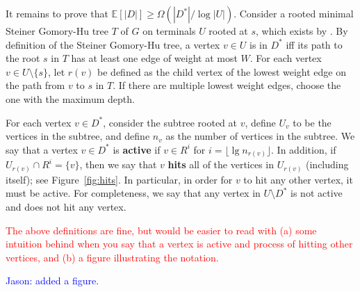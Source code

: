 \documentclass{article}
\newcommand{\sm}{\setminus}
\newcommand{\Om}{\Omega}
\newcommand{\lf}{\lfloor}
\newcommand{\rf}{\rfloor}
\newcommand{\E}{\mathbb E}
\newcommand{\1}{\mathbbm 1}
\newcommand{\alert}{\textcolor{red}}
\newcommand{\thm}[1]{\Cref{thm:#1}}
\renewcommand{\emph}[1]{\textbf{\textup{#1}}}
\begin{document}
It remains to prove that $\E[|D|]\ge\Om(|D^*|/\log|U|)$. Consider a rooted minimal Steiner Gomory-Hu tree $T$ of $G$ on terminals $U$ rooted at $s$, which exists by \thm{rooted}. By definition of the Steiner Gomory-Hu tree, a vertex $v\in U$ is in $D^*$ iff its path to the root $s$ in $T$ has at least one edge of weight at most $ W$. For each vertex $v\in U\sm \{s\}$, let $r(v)$ be defined as the child vertex of the lowest weight edge on the path from $v$ to $s$ in $T$. If there are multiple lowest weight edges, choose the one with the maximum depth. %


For each vertex $v\in D^*$, consider the subtree rooted at $v$, define $U_v$ to be the vertices in the subtree, and define $n_v$ as the number of vertices in the subtree. We say that a vertex $v\in D^*$ is \emph{active} if $v\in R^i$ for $i=\lf\lg n_{r(v)}\rf$. In addition, if $U_{r(v)}\cap R^i=\{v\}$, then we say that $v$ \emph{hits} all of the vertices in $U_{r(v)}$ (including itself); see Figure~\ref{fig:hits}. In particular, in order for $v$ to hit any other vertex, it must be active. For completeness, we say that any vertex in $U\sm D^*$ is not active and does not hit any vertex.

\alert{The above definitions are fine, but would be easier to read with (a) some intuition behind when you say that a vertex is active and process of hitting other vertices, and (b) a figure illustrating the notation.} 

\textcolor{blue}{Jason: added a figure.}
\end{document}
